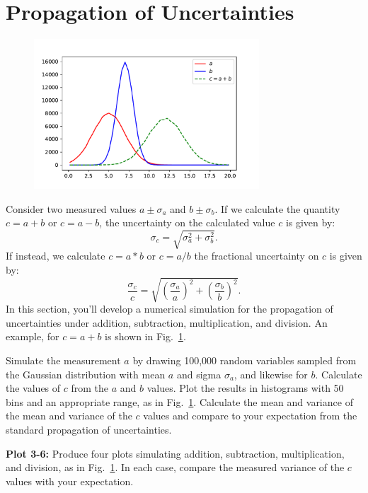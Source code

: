 \section{Propagation of Uncertainties}

\begin{figure}[htbp]
\begin{center}
\includegraphics[width=0.75\textwidth]{figs/labs/uncertainties/addunc.pdf}\\
\end{center}
\caption{\label{fig:addunc}}
\end{figure}

Consider two measured values $a \pm \sigma_a$ and $b \pm \sigma_b$.  If we calculate the quantity $c = a + b$ or $c = a - b$, the uncertainty on the calculated value $c$ is given by:
\begin{displaymath}
\sigma_c = \sqrt{\sigma_a^2 + \sigma_b^2}.
\end{displaymath}
If instead, we calculate $c = a * b$ or $c = a/b$ the fractional uncertainty on $c$ is given by:
\begin{displaymath}
\frac{\sigma_c}{c} = \sqrt{\left(\frac{\sigma_a}{a}\right)^2 + \left(\frac{\sigma_b}{b}\right)^2}.
\end{displaymath}
In this section, you'll develop a numerical simulation for the
propagation of uncertainties under addition, subtraction,
multiplication, and division.  An example, for $c = a + b$ is shown in Fig.~\ref{fig:addunc}.

Simulate the measurement $a$ by drawing 100,000 random variables
sampled from the Gaussian distribution with mean $a$ and sigma
$\sigma_a$, and likewise for $b$.  Calculate the values of $c$ from
the $a$ and $b$ values.  Plot the results in histograms with 50 bins and an appropriate range, as in Fig.~\ref{fig:addunc}.  Calculate the mean and variance of the mean and variance of the $c$ values and compare to your expectation from the standard propagation of uncertainties.

{\bf Plot 3-6:}  Produce four plots simulating addition, subtraction, multiplication, and division, as in Fig.~\ref{fig:addunc}.  In each case, compare the measured variance of the $c$ values with your expectation.






























